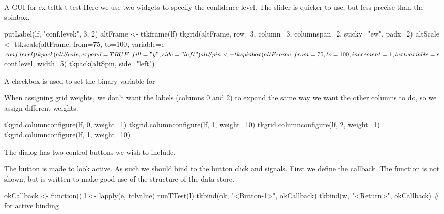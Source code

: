 \begin{example}{A GUI for }{ex-tcltk-t-test}
Here we use two widgets to specify the confidence level. The slider
is quicker to use, but less precise than the spinbox.
\begin{Schunk}
\begin{Sinput}
 putLabel(lf, "conf.level:", 3, 2)
 altFrame <- ttkframe(lf)
 tkgrid(altFrame, row=3, column=3, columnspan=2, 
        sticky="ew", padx=2)
 altScale <- ttkscale(altFrame, from=75, to=100, 
                      variable=e$conf.level)
 tkpack(altScale, expand=TRUE, fill="y", side="left")
 altSpin <- tkspinbox(altFrame, from=75, to=100, increment=1, 
                      textvariable=e$conf.level, width=5)
 tkpack(altSpin, side="left")
\end{Sinput}
\end{Schunk}

A checkbox is used to set the binary variable for 
\begin{Schunk}
\end{Schunk}

When assigning grid weights, we don't want the labels (columns 0 and 2) to expand the same way we want the other columns to do, so we assign different weights.
\begin{Schunk}
\begin{Sinput}
 tkgrid.columnconfigure(lf, 0, weight=1)
 tkgrid.columnconfigure(lf, 1, weight=10)
 tkgrid.columnconfigure(lf, 2, weight=1)
 tkgrid.columnconfigure(lf, 1, weight=10)
\end{Sinput}
\end{Schunk}

The dialog has two control buttons we wish to include.
\begin{Schunk}
\end{Schunk}

The  button is made to look active. As such we should bind to the button click and  signals. First we define the callback. The  function is not shown, but is written to make good use of the structure of the data store.
\begin{Schunk}
\begin{Sinput}
 okCallback <- function() {
   l <- lapply(e, tclvalue)
   runTTest(l)
 }
 tkbind(ok, "<Button-1>", okCallback)
 tkbind(w, "<Return>", okCallback)        # for active binding
\end{Sinput}
\end{Schunk}


\end{example}
